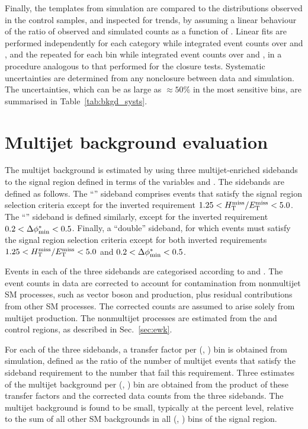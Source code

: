Finally, the \mht templates from simulation are compared to the
distributions observed in the control samples, and inspected for
trends, by assuming a linear behaviour of the ratio of observed and
simulated counts as a function of \mht. Linear fits are performed
independently for each \njet category while integrated event counts
over \nb and \scalht, and the repeated for each \scalht bin while
integrated event counts over \njet and \nb, in a procedure analogous
to that performed for the closure tests. Systematic uncertainties are
determined from any nonclosure between data and simulation. The
uncertainties, which can be as large as ${\approx}50\%$ in the most
sensitive \mht bins, are summarised in Table~\ref{tab:bkgd_systs}.


\section{Multijet background evaluation}
\label{sec:qcd}

The multijet background is estimated by using three multijet-enriched
sidebands to the signal region defined in terms of the variables
\mhtmet and \bdphi. The sidebands are defined as follows. The
``\mhtmet'' sideband comprises events that satisfy the signal region
selection criteria except for the inverted requirement $1.25 < H_{\text{T}}^{\text{miss}} / E_{\text{T}}^{\text{miss}}
< 5.0$. The ``\bdphi'' sideband is defined similarly, except for the
inverted requirement $0.2 < \Delta\phi^{*}_\text{min} < 0.5$. Finally, a ``double''
sideband, for which events must satisfy the signal region selection
criteria except for both inverted requirements $1.25 < H_{\text{T}}^{\text{miss}} / E_{\text{T}}^{\text{miss}} < 5.0$
and $0.2 < \Delta\phi^{*}_\text{min} < 0.5$.

Events in each of the three sidebands are categorised according to
\njet and \scalht. The event counts in data are corrected to account
for contamination from nonmultijet SM processes, such as vector boson
and \ttbar production, plus residual contributions from other SM
processes. The corrected counts are assumed to arise solely from
multijet production. The nonmultijet processes are estimated from the
\mj and \mmj control regions, as described in Sec.~\ref{sec:ewk}.

For each of the three sidebands, a transfer factor per (\njet,
\scalht) bin is obtained from simulation, defined as the ratio of the
number of multijet events that satisfy the sideband requirement to the
number that fail this requirement. Three estimates of the multijet
background per (\njet, \scalht) bin are obtained from the product of
these transfer factors and the corrected data counts from the three
sidebands. The multijet background is found to be small, typically at
the percent level, relative to the sum of all other SM backgrounds in
all (\njet, \nb) bins of the signal region.


